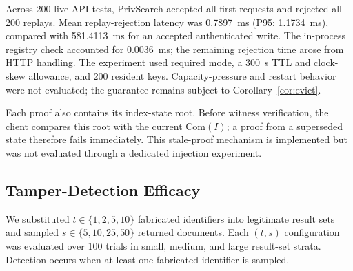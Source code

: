 \documentclass[journal]{IEEEtran}
\theoremstyle{tight}
\theoremstyle{remark}
\theoremstyle{plain}
\begin{document}
Across 200 live-API tests, PrivSearch accepted all first requests and rejected all 200 replays. Mean replay-rejection latency was 0.7897~ms (P95: 1.1734~ms), compared with 581.4113~ms for an accepted authenticated write. The in-process registry check accounted for 0.0036~ms; the remaining rejection time arose from HTTP handling. The experiment used required mode, a 300~s TTL and clock-skew allowance, and 200 resident keys. Capacity-pressure and restart behavior were not evaluated; the guarantee remains subject to Corollary~\ref{cor:evict}.

Each proof also contains its index-state root. Before witness verification, the client compares this root with the current \(\mathrm{Com}(I)\); a proof from a superseded state therefore fails immediately. This stale-proof mechanism is implemented but was not evaluated through a dedicated injection experiment.

\subsection{Tamper-Detection Efficacy}
\label{4Ntd}

We substituted \(t\in\{1,2,5,10\}\) fabricated identifiers into legitimate result sets and sampled \(s\in\{5,10,25,50\}\) returned documents. Each \((t,s)\) configuration was evaluated over 100 trials in small, medium, and large result-set strata. Detection occurs when at least one fabricated identifier is sampled.
\end{document}
